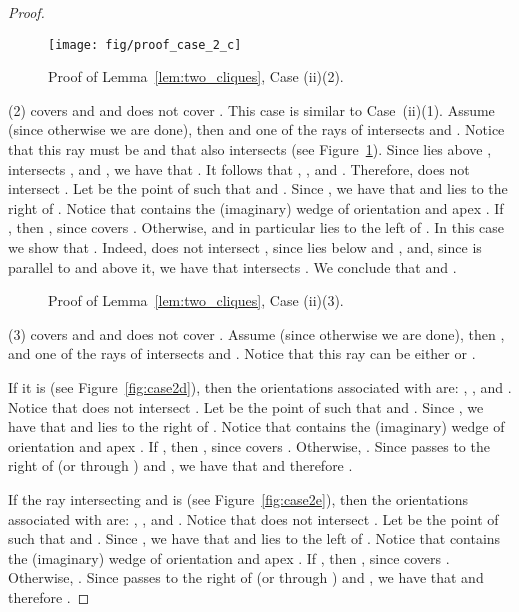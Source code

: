\documentclass[11pt]{article}
\begin{document}
{\begin{proof}
\begin{figure}[htb]
 \centering
       \texttt{[image: fig/proof\_case\_2\_c]}
 \caption{Proof of Lemma~\ref{lem:two_cliques}, Case (ii)(2).}	\label{fig:case2c}	
\end{figure} 
  
(2)  covers  and  and does not cover . This case is similar to Case~(ii)(1). Assume  (since otherwise
we are done), then 
and one of the rays of  intersects  and . Notice that this ray must be  and that  also intersects  (see Figure~\ref{fig:case2c}).
Since  lies above ,  intersects , and , we have that . 
It follows that , , and . Therefore,  does not intersect .
Let  be the point of  such that  and
. 
Since , we have that  and  lies to the right of . Notice that  contains the (imaginary) wedge of orientation  and apex . If , then , since  covers . 
Otherwise,  and in particular  lies to the left of . In this case we show that . Indeed,  does not intersect , since  lies below  and , and, since  is parallel to  and above it, we have that  intersects . We conclude that  and .

\begin{figure}[htb]
 \centering 
 \caption{Proof of Lemma~\ref{lem:two_cliques}, Case (ii)(3).}	\label{fig:caseb}
\end{figure}
 
(3)  covers  and  and does not cover . Assume  (since otherwise
we are done), then ,
and one of the rays of  intersects  and . Notice that this ray 
can be either  or . 

If it is  (see Figure~\ref{fig:case2d}), then
the orientations associated with  are:
, , and .
Notice that  does not intersect .
Let  be the point of  such that  and . Since , we have that  and  lies to the right of . 
Notice that  contains the (imaginary) wedge of orientation  and apex . If , then , since  covers . 
Otherwise, . Since  passes to the right of  (or through ) and , we have that  and therefore .

If the ray intersecting  and  is  (see Figure~\ref{fig:case2e}), then
the orientations associated with  are:
, , and .
Notice that  does not intersect .
Let  be the point of  such that  and . 
Since , we have that  and  lies to the left of . 
Notice that  contains the (imaginary) wedge of orientation  and apex . If , then , since  covers . 
Otherwise, . Since  passes to the right of  (or through ) and , we have that  and therefore .


\end{proof}}
\end{document}
